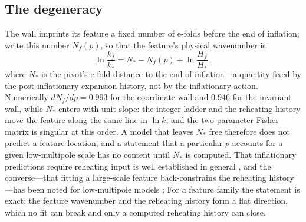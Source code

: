 \documentclass[aps,prd,twocolumn,superscriptaddress,nofootinbib,longbibliography]{revtex4-2}
\begin{document}
\subsection{The degeneracy}
The wall imprints its feature a fixed number of e-folds before the end of
inflation; write this number $N_f(p)$, so that the feature's physical
wavenumber is
\begin{equation}
\ln\frac{k_f}{k_*}=N_*-N_f(p)+\ln\frac{H_f}{H_*},
\end{equation}
where $N_*$ is the pivot's e-fold distance to the end of inflation---a
quantity fixed by the post-inflationary expansion history, not by the
inflationary action. Numerically $dN_f/dp=0.993$ for the coordinate wall and $0.946$ for the
invariant wall, while $N_*$ enters with unit slope: the integer ladder and the reheating history move the feature along
the same line in $\ln k$, and the two-parameter Fisher matrix is singular at
this order. A model that leaves $N_*$ free therefore does not predict a
feature location, and a statement that a particular $p$ accounts for a given
low-multipole scale has no content until $N_*$ is computed. That
inflationary predictions require reheating input is well established in
general \cite{LiddleLeach2003,MartinRingeval2010,Dai2014,MRV2014}, and the
converse---that fitting a large-scale feature back-constrains the reheating
history---has been noted for low-multipole models \cite{GoswamiYajnik2018};
For a feature family the statement is exact: the feature wavenumber and
the reheating history form a flat direction, which no fit can break and
only a computed reheating history can close.
\end{document}
